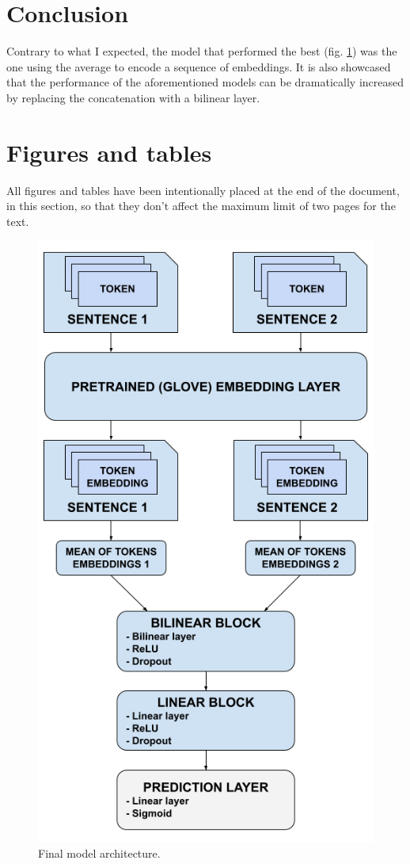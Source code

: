 \documentclass[11pt,a4paper]{article}
\begin{document}
	\section{Conclusion}
	Contrary to what I expected, the model that performed the best (fig. \ref{fig:architecture}) was the one using the average to encode a sequence of embeddings. It is also showcased that the performance of the aforementioned models can be dramatically increased by replacing the concatenation with a bilinear layer.
	\clearpage
	\section{Figures and tables}
	All figures and tables have been intentionally placed at the end of the document, in this section, so that they don't affect the maximum limit of two pages for the text.
	\begin{figure}[H]
		\centering
		\includegraphics[width=1\columnwidth]{bilinear_model.png}
		\caption{Final model architecture.}
		\label{fig:architecture}
	\end{figure}
\end{document}
